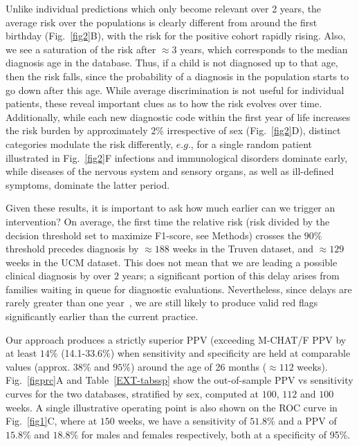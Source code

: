 \documentclass[onecolumn,,10pt]{IEEEtran}
\def\treatment{positive\xspace}
\begin{document}
Unlike individual predictions which only become relevant over 2 years, the average risk over the populations is clearly different  from around the  first birthday (Fig.~\ref{fig2}B), with the risk for the  \treatment cohort rapidly rising. Also, we see a saturation of the risk after $\approx 3$ years, which corresponds to the median diagnosis age in the database. Thus, if a child is not diagnosed up to that age, then the  risk  falls, since the probability of a diagnosis in the population starts to go down after this age. While average discrimination is not useful for individual patients, these reveal important clues as to how the  risk evolves over time. Additionally, while  each  new diagnostic code within the first year of life  increases the risk burden by approximately $2\%$ irrespective of sex (Fig.~\ref{fig2}D), distinct  categories modulate the risk differently, $e.g.$, for a single random patient  illustrated in Fig.~\ref{fig2}F infections and immunological disorders dominate early, while  diseases of the nervous system and sensory organs, as well as ill-defined symptoms,  dominate the latter period.

Given these results, it is important to ask how much earlier can we trigger an intervention? On average,  the first time the relative risk (risk divided by the decision threshold set to maximize F1-score, see Methods) crosses the $90\%$ threshold precedes  diagnosis by  $\approx 188$ weeks in the Truven dataset, and $\approx 129$ weeks in the UCM dataset. This does not mean that we are   leading a possible clinical diagnosis by over $2$ years; a significant portion of this delay arises from families waiting in queue for diagnostic evaluations. Nevertheless, since delays are rarely greater than   one year~\cite{gordon2016whittling},  we are still likely to produce valid red flags significantly earlier than the current practice.

Our approach produces a strictly superior PPV (exceeding M-CHAT/F PPV by at  least $14\%$ (14.1-33.6\%) when sensitivity and specificity are held at comparable values (approx. $38\%$ and $95\%$) around the age of 26 months ($\approx 112$ weeks). Fig.~\ref{figprc}A and Table~\ref{EXT-tabssp} show  the out-of-sample  PPV vs sensitivity curves   for the two databases, stratified by sex, computed at $100$, $112$ and $100$ weeks. A single illustrative operating point is also shown on the ROC curve in Fig.~\ref{fig1}C, where at $150$ weeks, we have a sensitivity of $51.8\%$ and a PPV of $15.8\%$ and $18.8\%$ for males and females respectively, both at a specificity of 95\%. 
\end{document}
